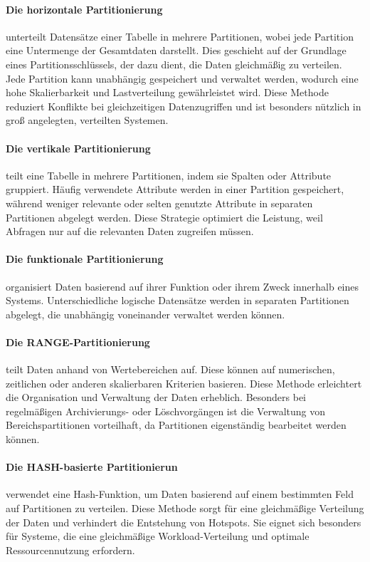     \paragraph{Die horizontale Partitionierung} unterteilt Datensätze einer Tabelle in mehrere Partitionen, wobei jede Partition eine Untermenge der Gesamtdaten darstellt. Dies geschieht auf der Grundlage eines Partitionsschlüssels, der dazu dient, die Daten gleichmäßig zu verteilen. Jede Partition kann unabhängig gespeichert und verwaltet werden, wodurch eine hohe Skalierbarkeit und Lastverteilung gewährleistet wird. Diese Methode reduziert Konflikte bei gleichzeitigen Datenzugriffen und ist besonders nützlich in groß angelegten, verteilten Systemen.
    \paragraph{Die vertikale Partitionierung} teilt eine Tabelle in mehrere Partitionen, indem sie Spalten oder Attribute gruppiert. Häufig verwendete Attribute werden in einer Partition gespeichert, während weniger relevante oder selten genutzte Attribute in separaten Partitionen abgelegt werden. Diese Strategie optimiert die Leistung, weil Abfragen nur auf die relevanten Daten zugreifen müssen.
    \paragraph{Die funktionale Partitionierung} organisiert Daten basierend auf ihrer Funktion oder ihrem Zweck innerhalb eines Systems. Unterschiedliche logische Datensätze werden in separaten Partitionen abgelegt, die unabhängig voneinander verwaltet werden können.
    \paragraph{Die RANGE-Partitionierung} teilt Daten anhand von Wertebereichen auf. Diese können auf numerischen, zeitlichen oder anderen skalierbaren Kriterien basieren. Diese Methode erleichtert die Organisation und Verwaltung der Daten erheblich. Besonders bei regelmäßigen Archivierungs- oder Löschvorgängen ist die Verwaltung von Bereichspartitionen vorteilhaft, da Partitionen eigenständig bearbeitet werden können.
    \paragraph{Die HASH-basierte Partitionierun} verwendet eine Hash-Funktion, um Daten basierend auf einem bestimmten Feld auf Partitionen zu verteilen. Diese Methode sorgt für eine gleichmäßige Verteilung der Daten und verhindert die Entstehung von Hotspots. Sie eignet sich besonders für Systeme, die eine gleichmäßige Workload-Verteilung und optimale Ressourcennutzung erfordern.
